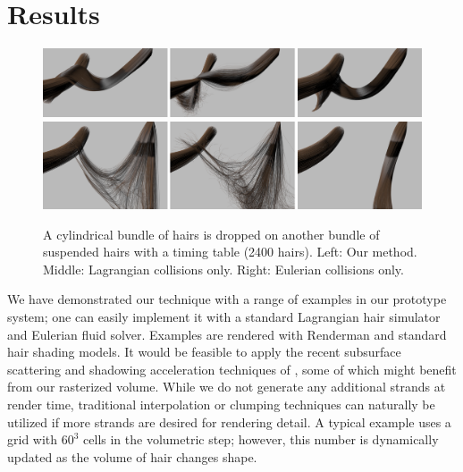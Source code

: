 \section{Results}

\begin{figure}[htb]
\centering
\includegraphics[width=.99\linewidth]{hair/images/tubes/tubes_2_row}
\includegraphics[width=.99\linewidth]{hair/images/tubes/tubes_3_row}
\caption[A result comparison of collision algorithms.]{\label{fig:tubes} A cylindrical bundle of hairs is 
dropped on another
  bundle of suspended hairs with a timing table (2400 hairs). Left:
  Our method. Middle: Lagrangian collisions only. Right: Eulerian
  collisions only.}
\end{figure}

We have demonstrated our technique with a range of examples in our prototype
system; one can easily implement it with a standard Lagrangian hair simulator
and Eulerian fluid solver.  Examples are rendered with Renderman and standard hair
shading models. It would be feasible to apply the recent subsurface scattering and
shadowing acceleration techniques of
\cite{moon:2008:hair-render,zinke:2008:hair-render,bertails:2005:render}, some of
which might benefit from our rasterized volume.  While we
do not generate any additional strands at render time, traditional
interpolation or clumping techniques can naturally be utilized if more strands
are desired for rendering detail. A typical example uses a grid with
$60^3$ cells in the volumetric step; however, this number is
dynamically updated as the volume of hair changes shape.

